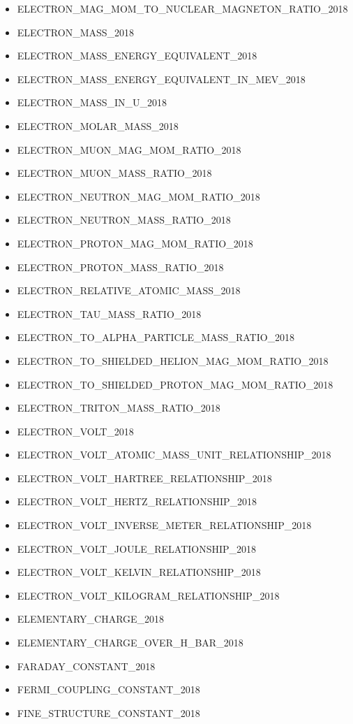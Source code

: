 \begin{itemize}
\item ELECTRON\_MAG\_MOM\_TO\_NUCLEAR\_MAGNETON\_RATIO\_2018
\item ELECTRON\_MASS\_2018
\item ELECTRON\_MASS\_ENERGY\_EQUIVALENT\_2018
\item ELECTRON\_MASS\_ENERGY\_EQUIVALENT\_IN\_MEV\_2018
\item ELECTRON\_MASS\_IN\_U\_2018
\item ELECTRON\_MOLAR\_MASS\_2018
\item ELECTRON\_MUON\_MAG\_MOM\_RATIO\_2018
\item ELECTRON\_MUON\_MASS\_RATIO\_2018
\item ELECTRON\_NEUTRON\_MAG\_MOM\_RATIO\_2018
\item ELECTRON\_NEUTRON\_MASS\_RATIO\_2018
\item ELECTRON\_PROTON\_MAG\_MOM\_RATIO\_2018
\item ELECTRON\_PROTON\_MASS\_RATIO\_2018
\item ELECTRON\_RELATIVE\_ATOMIC\_MASS\_2018
\item ELECTRON\_TAU\_MASS\_RATIO\_2018
\item ELECTRON\_TO\_ALPHA\_PARTICLE\_MASS\_RATIO\_2018
\item ELECTRON\_TO\_SHIELDED\_HELION\_MAG\_MOM\_RATIO\_2018
\item ELECTRON\_TO\_SHIELDED\_PROTON\_MAG\_MOM\_RATIO\_2018
\item ELECTRON\_TRITON\_MASS\_RATIO\_2018
\item ELECTRON\_VOLT\_2018
\item ELECTRON\_VOLT\_ATOMIC\_MASS\_UNIT\_RELATIONSHIP\_2018
\item ELECTRON\_VOLT\_HARTREE\_RELATIONSHIP\_2018
\item ELECTRON\_VOLT\_HERTZ\_RELATIONSHIP\_2018
\item ELECTRON\_VOLT\_INVERSE\_METER\_RELATIONSHIP\_2018
\item ELECTRON\_VOLT\_JOULE\_RELATIONSHIP\_2018
\item ELECTRON\_VOLT\_KELVIN\_RELATIONSHIP\_2018
\item ELECTRON\_VOLT\_KILOGRAM\_RELATIONSHIP\_2018
\item ELEMENTARY\_CHARGE\_2018
\item ELEMENTARY\_CHARGE\_OVER\_H\_BAR\_2018
\item FARADAY\_CONSTANT\_2018
\item FERMI\_COUPLING\_CONSTANT\_2018
\item FINE\_STRUCTURE\_CONSTANT\_2018

\end{itemize}
